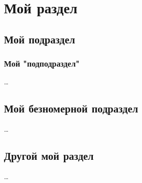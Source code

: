 \documentclass[a4paper, 12pt]{article}
\begin{document}
    \section*{\centering Мой раздел} %
    \subsection{Мой подраздел} %
    \subsubsection{Мой "подподраздел"}
    \dots %

    \subsection*{Мой безномерной подраздел} %
    \dots

    \subsection{Другой мой раздел}
    \dots
\end{document}

